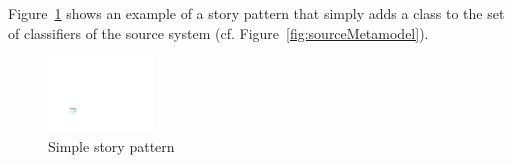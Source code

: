 Figure~\ref{fig:SP} shows an example of a story pattern that simply adds a class to the set of classifiers of the source system (cf. Figure~\ref{fig:sourceMetamodel}).

\begin{figure}[htbp]
\begin{center}
  \includegraphics[width=0.25\textwidth]{figures/StoryPattern}
  \caption{Simple story pattern}
  \label{fig:SP}
\end{center}
\end{figure}